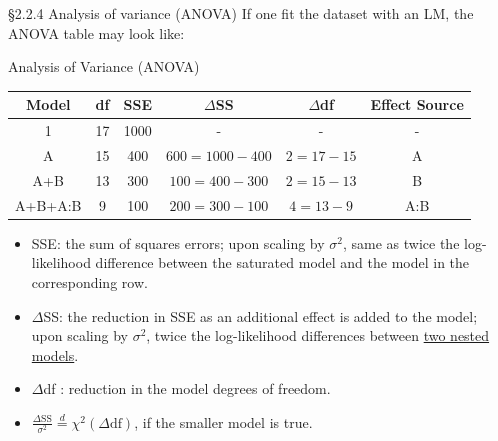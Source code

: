 \documentclass{beamer}
\newenvironment{wideitemize}%
  {\begin{itemize}%
    \setlength{\parskip}{1em}}%
  {\end{itemize}}
\begin{document}
\begin{frame}{\S2.2.4 Analysis of variance (ANOVA)}
 If one fit the dataset with an  LM, the ANOVA table 
may look like:

\begin{center} Analysis of Variance (ANOVA)\end{center}

{\small
\begin{tabular}{|cccccc|}\hline
Model & df & SSE & $\Delta$SS & $\Delta$df & Effect Source \\ \hline
1 & 17 & 1000 & - & -  & - \\ \hline
A & 15 & 400 & $600=1000-400$ & $2=17-15$ & A \\ \hline
A+B & 13 & 300 & $100=400-300$ & $2=15-13$ & B \\ \hline
A+B+A:B & 9 & 100 & $200=300-100$ & $4=13-9$ & A:B \\ \hline 
\end{tabular}}

\end{frame}

\begin{frame}
\begin{wideitemize}
\item SSE: the sum of squares errors;  upon scaling by $\sigma^2$, same as  twice the log-likelihood difference between the saturated model and the model in the corresponding row. 

\item 
$\Delta$SS: the reduction in SSE as an additional effect is added to the model; upon scaling by $\sigma^2$,  twice the log-likelihood differences between \underline{two nested models}.


\item
$\Delta$df : reduction in the  model degrees of freedom.

\item 
$\frac{\Delta\mbox{SS}}{\sigma^2}\stackrel{d}{=}\chi^2(\Delta\mbox{df})$, if  the smaller model is true. 




\end{wideitemize}

\end{frame}
\end{document}
